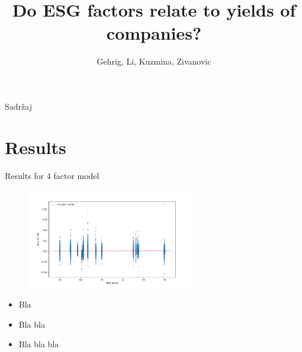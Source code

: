 \documentclass{beamer}%
\title[]{Do ESG factors relate to yields of companies?}
\author{Gehrig, Li, Kuzmina, Zivanovic}
\begin{document}
\begin{frame}
  \titlepage
\end{frame}

\begin{frame}{Sadržaj}
  \tableofcontents
\end{frame}



\section{Results}


\begin{frame}{Results for 4 factor model}
	\begin{figure}
		\vspace{-5pt}
			\includegraphics[width=0.65\textwidth]{../figures/regression.png}
		\centering
	\end{figure}
\begin{itemize}
\item Bla \pause
\item Bla bla \pause
\item Bla bla bla
\end{itemize}
\end{frame}
\end{document}
